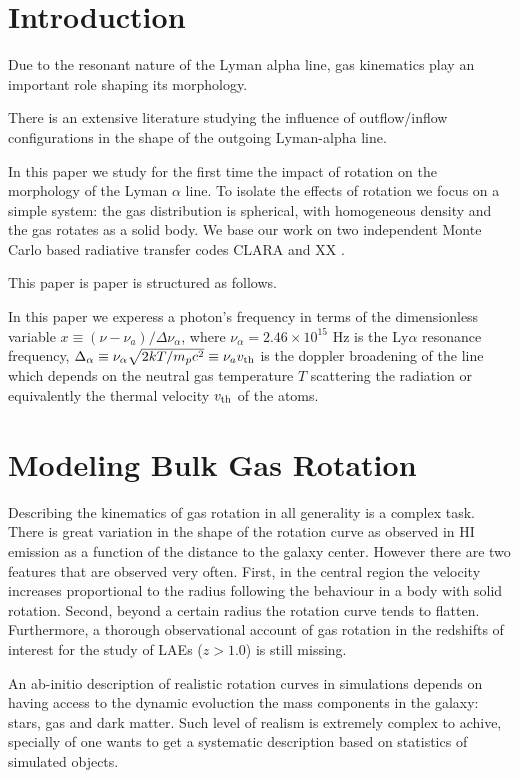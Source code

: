 \documentclass[usenatbib]{mn2e}
\begin{document}
\section{Introduction}
\label{sec:intro}


Due to the resonant nature of the Lyman alpha line, gas kinematics
play an important role shaping its morphology. 

There is an extensive literature studying the influence of
outflow/inflow configurations in the shape of the outgoing Lyman-alpha
line. 

In this paper we study for the first time the impact of rotation on
the morphology of the Lyman $\alpha$ line. To isolate the effects of
rotation we focus on a simple system: the gas distribution is
spherical, with homogeneous density and the gas rotates as a solid
body. We base our work on two independent Monte Carlo based radiative
transfer codes CLARA \citep{CLARA} and XX \citep{DijkstraKramer}.

 
This paper is paper is structured as follows.

In this paper we experess a photon's frequency in terms of the
dimensionless variable $x\equiv (\nu -\nu_a)/\Delta\nu_\alpha$, where
$\nu_{\alpha}=2.46\times 10^{15}$ Hz is the Ly$\alpha$ resonance
frequency,  $\Delta_{\alpha} \equiv
\nu_{\alpha}\sqrt{2kT/m_pc^2}\equiv \nu_av_{\rm th} $ is the doppler
broadening of the line which depends on the neutral gas temperature
$T$ scattering the radiation or equivalently the thermal velocity
$v_{\rm th}$ of the atoms.


\section{Modeling Bulk Gas Rotation}
\label{sec:implementation}

Describing the kinematics of gas rotation in all generality is a
complex task. There is great variation in the shape of the rotation
curve as observed in HI emission as a function of the distance to the
galaxy center. However there are two features that are observed very
often. First, in the central region the velocity increases
proportional to the radius following the behaviour in a body with
solid rotation. Second, beyond a certain radius the rotation curve
tends to flatten. Furthermore, a thorough observational account of gas
rotation in the redshifts of interest for the study of LAEs ($z>1.0$)
is still missing. 


An ab-initio description of realistic rotation curves in simulations
depends on having access to the dynamic evoluction the mass components
in the galaxy: stars, gas and dark matter. Such level of realism is
extremely complex to achive, specially of one wants to get a
systematic description based on statistics of simulated objects.
\end{document}
